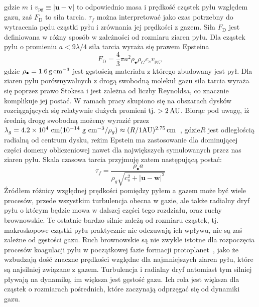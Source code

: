 gdzie $m$ i $v_{\textrm{pg}}\equiv|\mathbf{u} - \mathbf{v}|$ to odpowiednio masa
i prędkość cząstek pyłu względem gazu, zaś $F_\textrm{D}$ to siła tarcia.
$\tau_f$ można interpretować jako czas potrzebny do wytracenia pędu cząstki pyłu
i zrównania jej prędkości z gazem. Siła $F_\textrm{D}$ jest definiowana w różny
sposób w zależności od rozmiaru ziaren pyłu. Dla cząstek pyłu o promieniu $a < 9
\lambda / 4$ siła tarcia wyraża się prawem Epsteina 
\begin{equation}
   F_\textrm{D} = \frac{4}{3}\pi a^2 \rho_\bullet \rho_G c_s v_\textrm{pg}, 
\end{equation}
gdzie $\rho_\bullet = 1.6\hbox{$\thinspace\textrm{g}$}\hbox{$\thinspace\textrm{cm}$}^{-3}$ jest gęstością materiału z którego
zbudowany jest pył. Dla ziaren pyłu porównywalnych z drogą swobodną molekuł
gazu siła tarcia wyraża się poprzez prawo Stokesa i jest zależna od liczby
Reynoldsa, co znacznie komplikuje jej postać. W ramach pracy skupiono się na
obszarach dysków rozciągających się relatywnie dużych promieni tj. $>2\hbox{$\thinspace\textrm{AU}$}$.
Biorąc pod uwagę, iż średnią drogę swobodną możemy wyrazić przez $\lambda_g =
4.2\times 10^4\textrm{ cm} (10^{-14}\textrm{ g cm}^{-3}/\rho_g) \approx (R/1
\textrm{AU})^{2.75}\hbox{$\thinspace\textrm{cm}$}$~\citep{W77,BT09}, gdzie$R$ jest odległością radialną od
centrum dysku, reżim Epstein ma zastosowanie dla dominującej części domeny
obliczeniowej nawet dla największych symulowanych przez nas ziaren pyłu. Skala
czasowa tarcia przyjmuję zatem następującą postać:
%
\begin{equation} 
   \tau_f = \frac{\rho_\bullet a} {\rho_g \sqrt{c_s^2 +
      |\mathbf{u} - \mathbf{w}|^2 }} \label{eq:tauf} 
\end{equation}
%
Źródłem różnicy względnej prędkości pomiędzy pyłem a gazem może być wiele
procesów, przede wszystkim turbulencja obecna w gazie, ale także radialny dryf
pyłu o którym będzie mowa w dalszej części tego rozdziału, oraz ruchy
brownowskie. Te ostatnie bardzo silnie zależą od rozmiaru cząstek, tj.
makroskopowe cząstki pyłu praktycznie nie odczuwają ich wpływu, nie są zaś
zależne od gęstości gazu. Ruch brownowskie są nie zwykle istotne dla rozpoczęcia
procesów koagulacji pyłu w początkowej fazie formacji
protoplanet~\citep{DD2005}, jako że wzbudzają dość znaczne prędkości względne
dla najmniejszych ziaren pyłu, które są najsilniej związane z gazem. Turbulencja
i radialny dryf natomiast tym silniej pływają na dynamikę, im większa jest
gęstość gazu. Ich rola jest większa dla cząstek o rozmiarach pośrednich, które
zaczynają odprzęgać się od dynamiki gazu.

